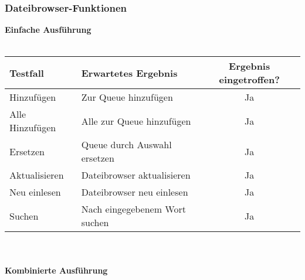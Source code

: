\subsubsection{Dateibrowser-Funktionen}
\textbf{Einfache Ausführung}\ \\ \\
\begin{tabular}[c]{|p{6cm}|p{6cm}|c|}
\hline
\textbf{Testfall} & \textbf{Erwartetes Ergebnis} & \textbf{Ergebnis eingetroffen?}\\
\hline
Hinzufügen & Zur Queue hinzufügen & Ja\\
\hline
Alle Hinzufügen & Alle zur Queue hinzufügen & Ja\\
\hline
Ersetzen & Queue durch Auswahl ersetzen & Ja\\
\hline
Aktualisieren & Dateibrowser aktualisieren & Ja\\
\hline
Neu einlesen & Dateibrowser neu einlesen & Ja\\
\hline
Suchen & Nach eingegebenem Wort suchen & Ja\\
\hline
\end{tabular}
\ \\ \\
\textbf{Kombinierte Ausführung}\ \\ \\
